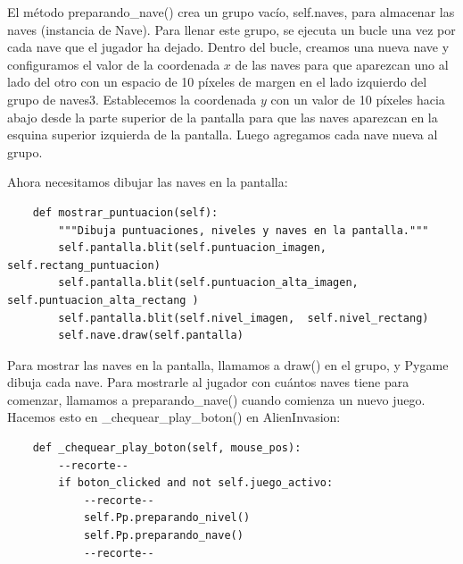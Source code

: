 El método {\ttfamily preparando\_nave()} crea un grupo vacío, {\ttfamily self.naves}, para almacenar las naves 
(instancia de Nave). Para llenar este grupo, se ejecuta un bucle una vez por cada nave que el jugador ha dejado. 
Dentro del bucle, creamos una nueva nave y configuramos el valor de la coordenada $x$  de las naves para que  aparezcan uno al lado del otro con un espacio de 10 píxeles de margen en el lado izquierdo del grupo de naves3. Establecemos la coordenada $y$ con 
un valor de 10 píxeles hacia abajo desde la parte superior de la pantalla para que las naves aparezcan en la
esquina superior izquierda de la pantalla. Luego agregamos cada nave nueva al grupo.


Ahora necesitamos dibujar las naves en la pantalla:

\hspace{-2.9cm}{\ttfamily \scriptsize puntuacion.py}  \vspace{-0.5cm}
\begin{lstlisting}		
    def mostrar_puntuacion(self):
        """Dibuja puntuaciones, niveles y naves en la pantalla."""
        self.pantalla.blit(self.puntuacion_imagen, self.rectang_puntuacion)
        self.pantalla.blit(self.puntuacion_alta_imagen, self.puntuacion_alta_rectang )
        self.pantalla.blit(self.nivel_imagen,  self.nivel_rectang)        
        self.nave.draw(self.pantalla)	
\end{lstlisting}

Para mostrar las naves en la pantalla, llamamos a {\ttfamily draw()} en el grupo, y Pygame dibuja cada nave. 
Para mostrarle al jugador con cuántos naves tiene para comenzar, llamamos a  {\ttfamily preparando\_nave()} cuando 
comienza un nuevo juego. Hacemos esto en {\ttfamily \_chequear\_play\_boton()} en {\ttfamily AlienInvasion}:

\hspace{-2.4cm}{\ttfamily \scriptsize invasión}

\vspace{-0.2cm}
\hspace{-2.1cm}{\ttfamily \scriptsize \_alien.py}\vspace{-0.84cm}
\begin{lstlisting}	
    def _chequear_play_boton(self, mouse_pos):
        --recorte-- 
        if boton_clicked and not self.juego_activo: 
            --recorte--  
            self.Pp.preparando_nivel() 
            self.Pp.preparando_nave() 
            --recorte--
\end{lstlisting}


